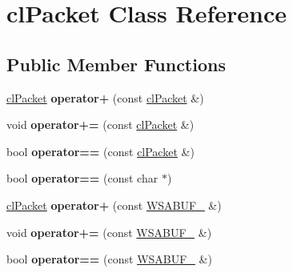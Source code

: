 \hypertarget{classcl_packet}{
\section{clPacket Class Reference}
\label{classcl_packet}
}
\subsection*{Public Member Functions}
\begin{DoxyCompactItemize}
\item 
\hypertarget{classcl_packet_a13adb28f7842a35d7a56c539c574782a}{
\hyperlink{classcl_packet}{clPacket} {\bfseries operator+} (const \hyperlink{classcl_packet}{clPacket} \&)}
\label{classcl_packet_a13adb28f7842a35d7a56c539c574782a}

\item 
\hypertarget{classcl_packet_a5e4c8791e640017fc5dcf277c73e45e4}{
void {\bfseries operator+=} (const \hyperlink{classcl_packet}{clPacket} \&)}
\label{classcl_packet_a5e4c8791e640017fc5dcf277c73e45e4}

\item 
\hypertarget{classcl_packet_a46bf4765a8e6755e95f598d596f15265}{
bool {\bfseries operator==} (const \hyperlink{classcl_packet}{clPacket} \&)}
\label{classcl_packet_a46bf4765a8e6755e95f598d596f15265}

\item 
\hypertarget{classcl_packet_a34d410d369f55b557b3be83b89298229}{
bool {\bfseries operator==} (const char $\ast$)}
\label{classcl_packet_a34d410d369f55b557b3be83b89298229}

\item 
\hypertarget{classcl_packet_abae317e5b8623d7c76384c9ec91dd6ed}{
\hyperlink{classcl_packet}{clPacket} {\bfseries operator+} (const \hyperlink{struct_w_s_a_b_u_f__2}{WSABUF\_} \&)}
\label{classcl_packet_abae317e5b8623d7c76384c9ec91dd6ed}

\item 
\hypertarget{classcl_packet_a7029a4beb2c95784b369f7977e3e24c3}{
void {\bfseries operator+=} (const \hyperlink{struct_w_s_a_b_u_f__2}{WSABUF\_} \&)}
\label{classcl_packet_a7029a4beb2c95784b369f7977e3e24c3}

\item 
\hypertarget{classcl_packet_a77be74591285be3e241ed7aa970cbece}{
bool {\bfseries operator==} (const \hyperlink{struct_w_s_a_b_u_f__2}{WSABUF\_} \&)}
\label{classcl_packet_a77be74591285be3e241ed7aa970cbece}


\end{DoxyCompactItemize}
